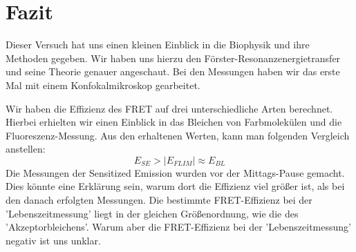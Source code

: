\chapter{Fazit}
Dieser Versuch hat uns einen kleinen Einblick in die Biophysik und ihre Methoden gegeben.
Wir haben uns hierzu den Förster-Resonanzenergietransfer und seine Theorie genauer angeschaut.
Bei den Messungen haben wir das erste Mal mit einem Konfokalmikroskop gearbeitet.\newline

Wir haben die Effizienz des FRET auf drei unterschiedliche Arten berechnet.
Hierbei erhielten wir einen Einblick in das Bleichen von Farbmolekülen und die Fluoreszenz-Messung.
Aus den erhaltenen Werten, kann man folgenden Vergleich anstellen:
\begin{equation}
    E_{SE}>\left|E_{FLIM}\right|\approx E_{BL}
\end{equation}
Die Messungen der Sensitized Emission wurden vor der Mittags-Pause gemacht.
Dies könnte eine Erklärung sein, warum dort die Effizienz viel größer ist, als bei den danach erfolgten Messungen.
Die bestimmte FRET-Effizienz bei der 'Lebenszeitmessung' liegt in der gleichen Größenordnung, wie die des 'Akzeptorbleichens'.
Warum aber die FRET-Effizienz bei der 'Lebenszeitmessung' negativ ist uns unklar.

